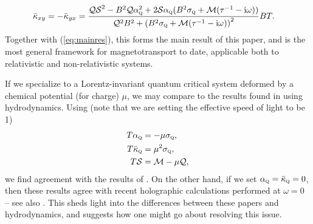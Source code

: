\documentclass[10pt, oneside]{book}
\begin{document}
\begin{doublespace}
\begin{subequations}
\begin{align}
\bar\kappa_{xy} = -\bar\kappa_{yx} &=  \frac{\mathcal{QS}^2-B^2\mathcal{Q}\alpha_{\textsc{q}}^2 + 2\mathcal{S}\alpha_{\textsc{q}}(B^2\sigma_{\textsc{q}}+\mathcal{M}(\tau^{-1}-\mathrm{i}\omega))}{\mathcal{Q}^2B^2 + \left(B^2\sigma_{\textsc{q}} + \mathcal{M}(\tau^{-1}-\mathrm{i}\omega)\right)^2}BT .
\end{align}\end{subequations}
Together with (\ref{eq:mainres}), this forms the main result of this paper, and is the most general framework for magnetotransport  to date, applicable both to relativistic and non-relativistic systems.

If we specialize to a Lorentz-invariant quantum critical system deformed by a chemical potential (for charge) $\mu$, we may compare to the results found in \cite{hkms} using hydrodynamics.   Using (note that we are setting the effective speed of light to be 1) \begin{subequations}\begin{align}
T\alpha_{\textsc{q}} &= -\mu \sigma_{\textsc{q}}, \\
T \bar\kappa_{\textsc{q}} &= \mu^2 \sigma_{\textsc{q}}, \\
T\mathcal{S} &= \mathcal{M} - \mu \mathcal{Q},
\end{align}\end{subequations}
we find agreement with the results of \cite{hkms}. 
On the other hand, if we set $\alpha_{\textsc{q}} = \bar\kappa_{\textsc{q}}=0$, then these results agree with recent holographic calculations performed at $\omega=0$  \cite{Amoretti:2015gna, Blake:2015ina, Kim:2015wba} -- see also \cite{holot4, holot5}.   This sheds light into the differences between these papers and hydrodynamics, and suggests how one might go about resolving this issue.


\end{doublespace}
\end{document}
